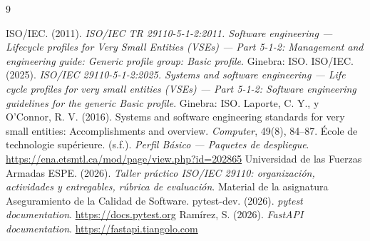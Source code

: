 \documentclass[11pt,a4paper]{article}
\begin{document}
\begin{thebibliography}{9}
 ISO/IEC. (2011). \emph{ISO/IEC TR 29110-5-1-2:2011. Software engineering — Lifecycle profiles for Very Small Entities (VSEs) — Part 5-1-2: Management and engineering guide: Generic profile group: Basic profile}. Ginebra: ISO.
 ISO/IEC. (2025). \emph{ISO/IEC 29110-5-1-2:2025. Systems and software engineering — Life cycle profiles for very small entities (VSEs) — Part 5-1-2: Software engineering guidelines for the generic Basic profile}. Ginebra: ISO.
 Laporte, C. Y., y O'Connor, R. V. (2016). Systems and software engineering standards for very small entities: Accomplishments and overview. \emph{Computer}, 49(8), 84--87.
 École de technologie supérieure. (s.f.). \emph{Perfil Básico — Paquetes de despliegue}. \url{https://ena.etsmtl.ca/mod/page/view.php?id=202865}
 Universidad de las Fuerzas Armadas ESPE. (2026). \emph{Taller práctico ISO/IEC 29110: organización, actividades y entregables, rúbrica de evaluación}. Material de la asignatura Aseguramiento de la Calidad de Software.
 pytest-dev. (2026). \emph{pytest documentation}. \url{https://docs.pytest.org}
 Ramírez, S. (2026). \emph{FastAPI documentation}. \url{https://fastapi.tiangolo.com}
\end{thebibliography}

\appendix
\end{document}
